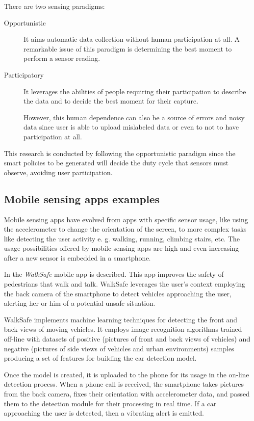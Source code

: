 There are two sensing paradigms:
\begin{description}
  \item[Opportunistic] It aims automatic data collection without human participation at all. A remarkable issue of this paradigm is determining the best moment to perform a sensor reading.

  \item[Participatory] It leverages the abilities of people requiring their participation to describe the data and to decide the best moment for their capture.

  However, this human dependence can also be a source of errors and noisy data since user is able to upload mislabeled data or even to not to have participation at all.
\end{description}


This research is conducted by following the opportunistic paradigm since the smart policies to be generated will decide the duty cycle that sensors must observe, avoiding user participation.


\subsection{Mobile sensing apps examples}
\label{sub:mobile_sensing_apps_examples}

Mobile sensing apps have evolved from apps with specific sensor usage, like using the accelerometer to change the orientation of the screen, to more complex tasks like detecting the user activity e. g. walking, running, climbing stairs, etc.
The usage possibilities offered by mobile sensing apps are high and even increasing after a new sensor is embedded in a smartphone.

In \cite{Wang2012} the \emph{WalkSafe} mobile app is described.
This app improves the safety of pedestrians that walk and talk. WalkSafe leverages the user's context employing the back camera of the smartphone to detect vehicles approaching the user, alerting her or him of a potential unsafe situation.

WalkSafe implements machine learning techniques for detecting the front and back views of moving vehicles.
It employs image recognition algorithms trained off-line with datasets of positive (pictures of front and back views of vehicles) and negative (pictures of side views of vehicles and urban environments) samples producing a set of features for building the car detection model.

Once the model is created, it is uploaded to the phone for its usage in the on-line detection process.
When a phone call is received, the smartphone takes pictures from the back camera, fixes their orientation with accelerometer data, and passed them to the detection module for their processing in real time.
If a car approaching the user is detected, then a vibrating alert is emitted.



